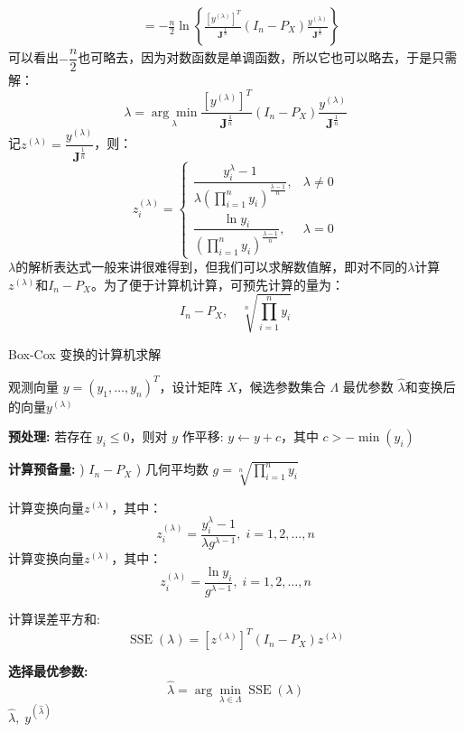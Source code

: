\begin{note}
\begin{align*}
		&=-\frac{n}{2}\ln\left\{\frac{[y^{(\lambda)}]^T}{\mathbf{J}^{\frac{1}{n}}}(I_n-P_X)\frac{y^{(\lambda)}}{\mathbf{J}^{\frac{1}{n}}}\right\}
	\end{align*}
	可以看出$-\dfrac{n}{2}$也可略去，因为对数函数是单调函数，所以它也可以略去，于是只需解：
	\begin{equation*}
		\lambda=\underset{\lambda}{\arg\min}\frac{[y^{(\lambda)}]^T}{\mathbf{J}^{\frac{1}{n}}}(I_n-P_X)\frac{y^{(\lambda)}}{\mathbf{J}^{\frac{1}{n}}}
	\end{equation*}
	记$z^{(\lambda)}=\dfrac{y^{(\lambda)}}{\mathbf{J}^{\frac{1}{n}}}$，则：
	\begin{equation*}
		z_i^{(\lambda)}=
		\begin{cases}
			\dfrac{y_i^{\lambda}-1}{\lambda\left(\prod\limits_{i=1}^{n}y_i\right)^{\frac{\lambda-1}{n}}},&\lambda\ne0 \\
			\dfrac{\ln y_i}{\left(\prod\limits_{i=1}^{n}y_i\right)^{\frac{\lambda-1}{n}}},&\lambda=0
		\end{cases}
	\end{equation*}
	$\lambda$的解析表达式一般来讲很难得到，但我们可以求解数值解，即对不同的$\lambda$计算$z^{(\lambda)}$和$I_n-P_X$。为了便于计算机计算，可预先计算的量为：
	\begin{equation*}
		I_n-P_X,\quad\sqrt[n]{\prod\limits_{i=1}^{n}y_i}
	\end{equation*}
\end{note}
\begin{algorithm}[H]
	\caption{Box-Cox 变换的计算机求解}
	\begin{algorithmic}[1]
		\Require 观测向量 $y = (y_1,\dots,y_n)^T$，设计矩阵 $X$，候选参数集合 $\Lambda$
		\Ensure 最优参数 $\hat{\lambda}$和变换后的向量$y^{(\lambda)}$
		
		\State \textbf{预处理:} 若存在 $y_i \le 0$，则对 $y$ 作平移: $y \gets y + c$，其中 $c > -\min(y_i)$
		
		\State \textbf{计算预备量:} 
		\Statex {}) $I_n - P_X$
		\Statex {}) 几何平均数 $g = \sqrt[n]{\prod\limits_{i=1}^n y_i}$
		
		\For{$\lambda \in \Lambda$}
		\State 计算变换向量$z^{(\lambda)}$，其中：
		\begin{equation*}
			z_i^{(\lambda)}=\dfrac{y_i^\lambda-1}{\lambda g^{\lambda-1}},\;i=1,2,\dots,n
		\end{equation*}
		\Else
		\State 计算变换向量$z^{(\lambda)}$，其中：
		\begin{equation*}
			z_i^{(\lambda)}=\dfrac{\ln y_i}{g^{\lambda-1}},\;i=1,2,\dots,n
		\end{equation*}
		\EndIf
		
		\State 计算误差平方和:
		\[
		\operatorname{SSE}(\lambda) = [z^{(\lambda)}]^T (I_n - P_X) z^{(\lambda)}
		\]
		\EndFor
		
		\State \textbf{选择最优参数:}
		\[
		\hat{\lambda} = \arg\min_{\lambda \in \Lambda}\operatorname{SSE}(\lambda)
		\]
		\State \Return $\hat{\lambda}, \; y^{(\hat{\lambda})}$
	\end{algorithmic}
\end{algorithm}

